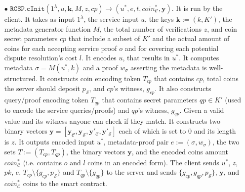 \begin{definition}[RC-S-P Scheme]
\begin{itemize}
\item[$\bullet$] $\mathtt{RCSP}.\mathtt{cInit}(1^\lambda, u,\bm{k}, M,z,cp)\rightarrow (u^{\scriptscriptstyle *},e,t,coin^{\scriptscriptstyle*}_{\scriptscriptstyle\mathcal C}, \bm{y})$. It is run by the client. It takes as input $1^\lambda$,  the service input $u$,  the keys  $\bm{k}:=(k, K')$,  the metadata generator function $M$, the total number of verifications $z$, and coin secret parameters $cp$ that include a subset of  $K'$ and the actual amount of coins for each accepting service proof $o$ and  for covering each potential dispute resolution's cost $l$.  It encodes $u$, that results in $u^{\scriptscriptstyle *}$.  It computes metadata $\sigma=M(u^{\scriptscriptstyle *},k)$ and a  proof $w_{\scriptscriptstyle\sigma}$ asserting the metadata is well-structured.  It constructs coin encoding token $T_{\scriptscriptstyle cp}$ that contains   $cp$, total coins the server should deposit $p_{\scriptscriptstyle\mathcal S}$, and   $cp$'s witness, $g_{\scriptscriptstyle cp}$.  It also constructs query/proof encoding token $T_{\scriptscriptstyle qp}$ that contains  secret  parameters $qp\in K'$ (used to encode the service queries/proofs)  and     $qp$'s witness,  $g_{\scriptscriptstyle qp}$.   Given a valid value and its witness  anyone can check if they match. It constructs two binary vectors $\bm{y}=[\bm{y}_{\scriptscriptstyle \mathcal  C}, \bm{y}_{\scriptscriptstyle \mathcal  S},\bm{y}'_{\scriptscriptstyle \mathcal  C}, \bm{y}'_{\scriptscriptstyle \mathcal  S}]$ each of which is set to $0$ and its length is $z$.  It outputs encoded input $u^{\scriptscriptstyle *}$, metadata-proof pair $e:=(\sigma,w_{\scriptscriptstyle\sigma})$, the two sets $T:=(T_{\scriptscriptstyle cp},T_{\scriptscriptstyle qp})$, the  binary vectors $\bm{y}$, and  the encoded coins amount  $coin^{\scriptscriptstyle*}_{\scriptscriptstyle\mathcal C}$ (i.e. contains $o$ and $l$ coins in an encoded form). The client sends  $u^{\scriptscriptstyle *}$, $z$, $pk$, $e$, $T_{\scriptscriptstyle cp} \setminus  \{g_{\scriptscriptstyle cp},p_{\scriptscriptstyle\mathcal S}\}$ and $T_{\scriptscriptstyle qp} \setminus  \{g_{\scriptscriptstyle qp}\}$ to the server and  sends $\{g_{\scriptscriptstyle cp},  g_{\scriptscriptstyle qp},p_{\scriptscriptstyle\mathcal S}\}$, $\bm{y}$,   and $coin^{\scriptscriptstyle*}_{\scriptscriptstyle\mathcal C}$ coins to the smart contract. 




\end{itemize}
\end{definition}
